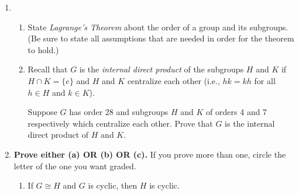 \documentclass[fleqn,12pt]{article}
\newcommand{\<}{\ensuremath{\langle}}
\renewcommand{\>}{\ensuremath{\rangle}}
\begin{document}
\begin{enumerate}[{\bf 1.}]
\begin{enumerate}
    {\bf Answer:} 

    A {\bf normal subgroup} of a group $G$ is a subgroup $N\leq G$ such that
    any one (hence all) of the following equivalent conditions holds for all $g\in G$:
    \begin{enumerate}
    \item $g N g^{-1} = N$;
    \item $g N = Ng$;
    \item $g n g^{-1} \in N$, for all $n\in N$.
    \end{enumerate}

    \bigskip


  \end{enumerate}

\newpage

\item
  \begin{enumerate}
  \item State \emph{Lagrange's Theorem} about the order of a group and its
    subgroups. (Be sure to state all assumptions that are needed in order for
    the theorem to hold.)  
\vskip7cm
    \item Recall that $G$ is the 
      \emph{internal direct product} of the subgroups $H$ and $K$ if 
      $H\cap K= \{e\}$ and $H$ and $K$ centralize each other (i.e., $hk = kh$ for
      all $h\in H$ and $k\in K$). 

      Suppose $G$ has order 28 and subgroups $H$ and $K$ of orders 4
      and 7 respectively which centralize each other.  Prove that
      $G$ is the internal direct product of $H$ and $K$.
  \end{enumerate}

\newpage
\item {\bf Prove either (a) OR (b) OR (c).} If you prove more than one, circle
  the letter of the one you want graded.

\begin{enumerate}
\item
If $G \cong H$ and $G$ is cyclic, then $H$ is cyclic.


\end{enumerate}
\end{enumerate}
\end{document}
